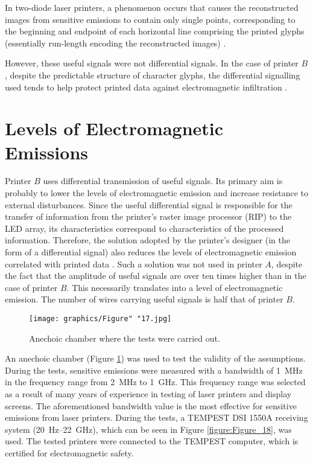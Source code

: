 \documentclass[letterpaper,journal]{ieeetran}
\begin{document}
In two-diode laser printers, a phenomenon occurs that causes the
reconstructed images from sensitive emissions to contain only single points,
corresponding to the beginning and endpoint of each horizontal line
comprising the printed glyphs (essentially run-length encoding
the reconstructed images) \cite{Kubiak2014d}.

However, these useful signals were not differential signals. In the case of
printer $B$, despite the predictable structure of character glyphs, the
differential signalling used tends to help protect printed data against
electromagnetic infiltration \cite{Ketenci2017a}.

\section{Levels of Electromagnetic Emissions}

Printer $B$ uses differential transmission of useful signals. Its primary aim
is probably to lower the levels of electromagnetic emission and increase
resistance to external disturbances. Since the useful differential signal is
responsible for the transfer of information from the printer's raster image
processor (RIP) to the LED array, its characteristics correspond to
characteristics of the processed information. Therefore, the solution adopted
by the printer's designer (in the form of a differential signal) also reduces
the levels of electromagnetic emission correlated with printed data
\cite{Song2015a}. Such a solution was not used in printer $A$, despite the
fact that the amplitude of useful signals are over ten times higher than in
the case of printer $B$. This necessarily translates into a level of
electromagnetic emission. The number of wires carrying useful signals is half
that of printer $B$.

\begin{figure}[ht]
    \centering
    \texttt{[image: graphics/Figure" "17.jpg]}
    \caption{Anechoic chamber where the tests were carried out.}
    \label{figure:Figure_17}
\end{figure}

An anechoic chamber (Figure \ref{figure:Figure_17}) was used to test the
validity of the assumptions.
During the tests, sensitive emissions were measured with a bandwidth of
\SI{1}{\mega\hertz} in the frequency range from \SI{2}{\mega\hertz} to
\SI{1}{\giga\hertz}. This frequency range was selected as a result of many
years of experience in testing of laser printers and display screens. The
aforementioned bandwidth value is the most effective for sensitive emissions
from laser printers. During the tests, a TEMPEST DSI 1550A receiving system
(\SI{20}{\hertz}--\SI{22}{\giga\hertz}), which can be seen in Figure
\ref{figure:Figure_18}, was used. The tested printers were connected to the
TEMPEST computer, which is certified for electromagnetic safety.
\end{document}
